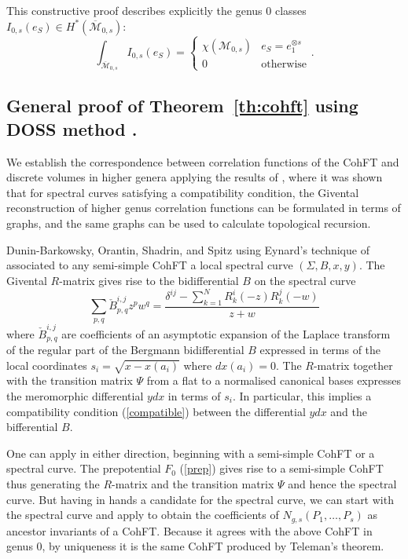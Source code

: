 \documentclass[11pt]{article}
\def\be{\begin{equation}}
\def\ee{\end{equation}}
\newcommand{\modm}{\mathcal{M}}
\theoremstyle{plain}
\theoremstyle{definition}
\let\text=\mathrm
\begin{document}
This constructive proof describes explicitly the genus 0 classes $I_{0,s}(e_S)\in H^*(\overline{\modm}_{0,s})$:
$$
\int_{\overline{\modm}_{0,s}} I_{0,s}(e_S)=\left\{\begin{array}{cc}\chi(\modm_{0,s})&e_S=e_1^{\otimes s}\\ 0&\text{otherwise}\end{array}\right..
$$

\subsection{General proof of Theorem~\ref{th:cohft} using DOSS method \cite{DOSSIde}.}

We establish the correspondence between correlation functions of the CohFT and discrete volumes in higher genera
applying the results of \cite{DOSSIde}, where it was shown that for spectral curves satisfying a compatibility condition, the Givental reconstruction of higher genus correlation functions can be formulated in terms of graphs, and the same graphs can be used to calculate topological recursion.  

Dunin-Barkowsky, Orantin, Shadrin, and Spitz \cite{DOSSIde} using Eynard's technique of \cite{Ey11}
associated to any semi-simple CohFT a local spectral curve $(\Sigma,B,x,y)$.  The Givental
$R$-matrix gives rise to the bidifferential $B$ on the spectral curve 
\be\label{Givental1}
\sum_{p,q}\check{B}^{i,j}_{p,q}z^pw^q=\frac{\delta^{ij}-\sum_{k=1}^NR^i_k(-z)R^j_k(-w)}{z+w}
\ee
where $\check{B}^{i,j}_{p,q}$ are coefficients of an asymptotic expansion of the Laplace transform of the regular part of 
the Bergmann bidifferential $B$ expressed in terms of the local coordinates $s_i=\sqrt{x-x(a_i)}$ where $dx(a_i)=0$.  The $R$-matrix together with the transition matrix $\Psi$ from a flat to a normalised canonical bases expresses the meromorphic differential $ydx$ in terms of $s_i$.  In particular, this implies a compatibility condition (\ref{compatible}) between the differential $ydx$ and the bifferential $B$.  


One can apply \cite{DOSSIde} in either direction, beginning with a semi-simple CohFT or a spectral curve.  The prepotential $F_0$ (\ref{prep}) gives rise to a semi-simple CohFT thus generating the $R$-matrix and the transition matrix $\Psi$ and hence the spectral curve.  But having in hands a candidate for the spectral curve, we can start with the spectral curve and apply \cite{DOSSIde} to obtain the coefficients of $N_{g,s}(P_1,\dots,P_s)$ as ancestor invariants of a CohFT.  Because it agrees with the above CohFT in genus 0, by uniqueness it is the same CohFT produced by Teleman's theorem.
\end{document}
